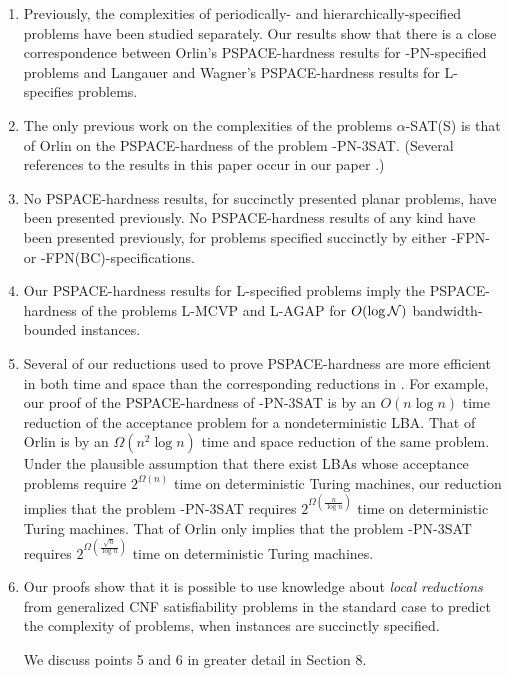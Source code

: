 \begin{enumerate}
\item 
Previously, the complexities of periodically- and hierarchically-specified
problems have been studied separately. Our results show that there is a
 close correspondence between Orlin's {\sf PSPACE-}hardness results for {-PN-}specified problems and Langauer and Wagner's {\sf PSPACE-}hardness 
results for {\sf L-}specifies problems.

\item 
The only previous work on the complexities of the problems 
$\alpha$-{\sf SAT(S)} is that of Orlin \cite{Or82a} on the 
{\sf PSPACE-}hardness of the problem {-PN-3SAT}. (Several references
to the results in this paper occur in our paper \cite{MR+93}.)

\item 
No {\sf PSPACE-}hardness results, for succinctly presented 
planar problems, have been presented previously. No {\sf PSPACE-}hardness 
results of any kind have been presented previously, for problems specified
succinctly by either {-FPN-} or {-FPN(BC)-}specifications.

\item 
Our {\sf PSPACE-}hardness results for {\sf L-}specified
problems imply the {\sf PSPACE-}hardness of the problems 
{\sf L-MCVP} and {\sf L-AGAP} for $O(\log {\cal N})$ 
bandwidth-bounded instances.

\item  
Several of our  reductions  used to prove {\sf PSPACE-}hardness
are more  efficient in both   time  and space than  the  corresponding
reductions in \cite{Or82a,LW92}. For example,   our proof of the  {\sf
PSPACE-}hardness  of  {-PN-3SAT}  is   by an  $O(n\log n)$  time
reduction of the acceptance problem  for a nondeterministic {\sf LBA}.
That of Orlin  \cite{Or82a} is  by  an $\Omega(n^2 \log n)$  time  and
space reduction  of the same  problem. Under the  plausible assumption
that  there exist   {\sf  LBA}s   whose acceptance  problems   require
$2^{\Omega(n)}$ time  on deterministic Turing machines,  our reduction
implies    that     the    problem     {-PN-3SAT}     requires
$2^{\Omega(\frac{n}{\log    n})}$   time  on   deterministic    Turing
machines. That of Orlin only  implies that the problem {-PN-3SAT}
requires   $2^{\Omega(\frac{\sqrt{n}}{\log n})}$ time on deterministic
Turing machines.

\item
Our proofs show that it is possible to use knowledge 
about {\em local reductions} from generalized {\sf CNF} satisfiability problems
in the standard case to predict the complexity of problems, when instances
are succinctly specified. 

We discuss points 5 and 6 in greater detail in Section 8.

\end{enumerate}
